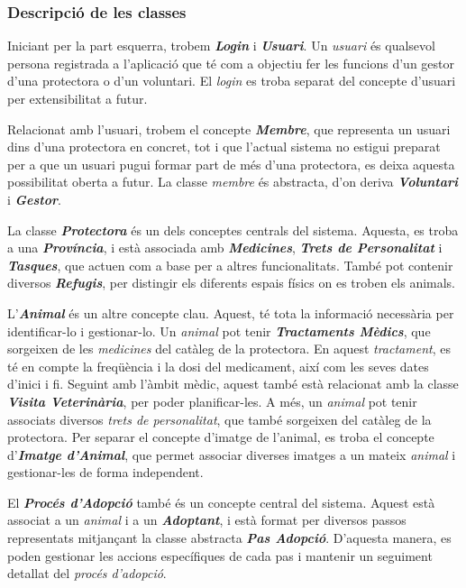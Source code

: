 \documentclass[11pt,a4paper]{report}
\begin{document}
\subsubsection{Descripció de les classes}
Iniciant per la part esquerra, trobem \textbf{\textit{Login}} i \textbf{\textit{Usuari}}. Un \textit{usuari} és qualsevol persona registrada a l'aplicació que té com a objectiu fer les funcions d'un gestor d'una protectora o d'un voluntari. El \textit{login} es troba separat del concepte d'usuari per extensibilitat a futur.

Relacionat amb l'usuari, trobem el concepte \textbf{\textit{Membre}}, que representa un usuari dins d'una protectora en concret, tot i que l'actual sistema no estigui preparat per a que un usuari pugui formar part de més d'una protectora, es deixa aquesta possibilitat oberta a futur. La classe \textit{membre} és abstracta, d'on deriva \textbf{\textit{Voluntari}} i \textbf{\textit{Gestor}}.

La classe \textbf{\textit{Protectora}} és un dels conceptes centrals del sistema. Aquesta, es troba a una \textbf{\textit{Província}}, i està associada amb \textbf{\textit{Medicines}}, \textbf{\textit{Trets de Personalitat}} i \textbf{\textit{Tasques}}, que actuen com a base per a altres funcionalitats. També pot contenir diversos \textbf{\textit{Refugis}}, per distingir els diferents espais físics on es troben els animals.

L'\textbf{\textit{Animal}} és un altre concepte clau. Aquest, té tota la informació necessària per identificar-lo i gestionar-lo. Un \textit{animal} pot tenir \textbf{\textit{Tractaments Mèdics}}, que sorgeixen de les \textit{medicines} del catàleg de la protectora. En aquest \textit{tractament}, es té en compte la freqüència i la dosi del medicament, així com les seves dates d'inici i fi. Seguint amb l'àmbit mèdic, aquest també està relacionat amb la classe \textbf{\textit{Visita Veterinària}}, per poder planificar-les. A més, un \textit{animal} pot tenir associats diversos \textit{trets de personalitat}, que també sorgeixen del catàleg de la protectora. Per separar el concepte d'imatge de l'animal, es troba el concepte d'\textbf{\textit{Imatge d'Animal}}, que permet associar diverses imatges a un mateix \textit{animal} i gestionar-les de forma independent.

El \textbf{\textit{Procés d'Adopció}} també és un concepte central del sistema. Aquest està associat a un \textit{animal} i a un \textbf{\textit{Adoptant}}, i està format per diversos passos representats mitjançant la classe abstracta \textbf{\textit{Pas Adopció}}. D'aquesta manera, es poden gestionar les accions específiques de cada pas i mantenir un seguiment detallat del \textit{procés d'adopció}.
\end{document}
